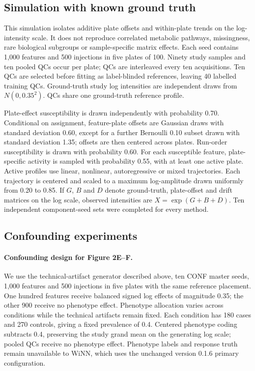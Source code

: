 \documentclass[namedate,webpdf,modern,large,nocrop]{oup-authoring-template}
\begin{document}
\subsection{Simulation with known ground truth}

This simulation isolates additive plate offsets and within-plate trends on the log-intensity scale. It does not reproduce correlated metabolic pathways, missingness, rare biological subgroups or sample-specific matrix effects. Each seed contains 1,000 features and 500 injections in five plates of 100. Ninety study samples and ten pooled QCs occur per plate; QCs are interleaved every ten acquisitions. Ten QCs are selected before fitting as label-blinded references, leaving 40 labelled training QCs. Ground-truth study log intensities are independent draws from \(N(0,0.35^2)\). QCs share one ground-truth reference profile.

Plate-effect susceptibility is drawn independently with probability 0.70. Conditional on assignment, feature-plate offsets are Gaussian draws with standard deviation 0.60, except for a further Bernoulli 0.10 subset drawn with standard deviation 1.35; offsets are then centered across plates. Run-order susceptibility is drawn with probability 0.60. For each susceptible feature, plate-specific activity is sampled with probability 0.55, with at least one active plate. Active profiles use linear, nonlinear, autoregressive or mixed trajectories. Each trajectory is centered and scaled to a maximum log-amplitude drawn uniformly from 0.20 to 0.85. If \(G\), \(B\) and \(D\) denote ground-truth, plate-offset and drift matrices on the log scale, observed intensities are \(X=\exp(G+B+D)\). Ten independent component-seed sets were completed for every method.

\subsection{Confounding experiments}

\paragraph{Confounding design for Figure 2E--F.} We use the technical-artifact generator described above, ten CONF master seeds, 1,000 features and 500 injections in five plates with the same reference placement. One hundred features receive balanced signed log effects of magnitude 0.35; the other 900 receive no phenotype effect. Phenotype allocation varies across conditions while the technical artifacts remain fixed. Each condition has 180 cases and 270 controls, giving a fixed prevalence of 0.4. Centered phenotype coding subtracts 0.4, preserving the study grand mean on the generating log scale; pooled QCs receive no phenotype effect. Phenotype labels and response truth remain unavailable to WiNN, which uses the unchanged version 0.1.6 primary configuration.
\end{document}
